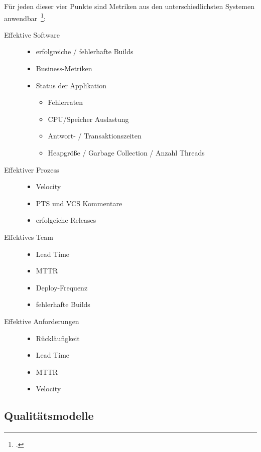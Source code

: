 Für jeden dieser vier Punkte sind Metriken aus den unterschiedlichsten Systemen anwendbar~\footcite[vgl.][S.219ff]{davis_agile_2015}:

\begin{description}
  \item[Effektive Software] \hfill
  \begin{itemize}[noitemsep]
    \item erfolgreiche / fehlerhafte Builds
    \item Business-Metriken
    \item Status der Applikation
    \begin{itemize}[noitemsep]
      \item Fehlerraten
      \item CPU/Speicher Auslastung
      \item Antwort- / Transaktionszeiten
      \item Heapgröße / Garbage Collection / Anzahl Threads
    \end{itemize}
  \end{itemize}
  \item[Effektiver Prozess] \hfill
  \begin{itemize}[noitemsep]
    \item Velocity
    \item \ac{PTS} und \ac{VCS} Kommentare
    \item erfolgeiche Releases
  \end{itemize}
  \item[Effektives Team] \hfill
  \begin{itemize}[noitemsep]
    \item Lead Time
    \item \ac{MTTR}
    \item Deploy-Frequenz
    \item fehlerhafte Builds
  \end{itemize}
  \item[Effektive Anforderungen] \hfill
  \begin{itemize}[noitemsep]
    \item Rückläufigkeit
    \item Lead Time
    \item \ac{MTTR}
    \item Velocity
  \end{itemize}
\end{description}

\clearpage
\subsection{Qualitätsmodelle}

